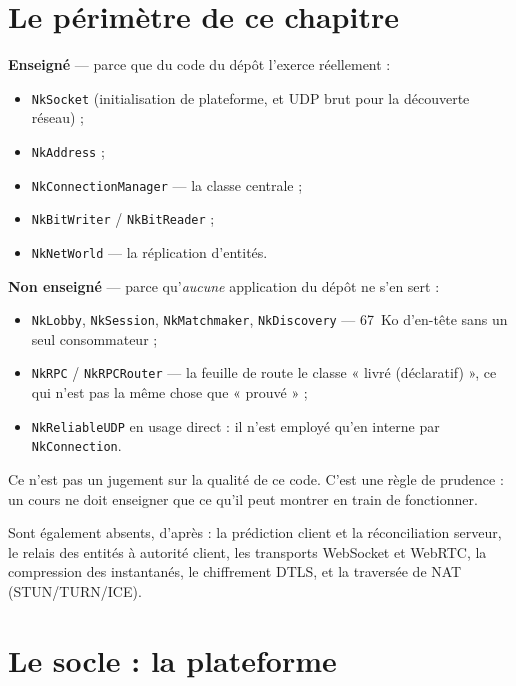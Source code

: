 \section{Le périmètre de ce chapitre}

\begin{nkretenir}
\textbf{Enseigné} — parce que du code du dépôt l'exerce réellement :
\begin{itemize}
  \item \texttt{NkSocket} (initialisation de plateforme, et UDP brut pour la
        découverte réseau) ;
  \item \texttt{NkAddress} ;
  \item \texttt{NkConnectionManager} — la classe centrale ;
  \item \texttt{NkBitWriter} / \texttt{NkBitReader} ;
  \item \texttt{NkNetWorld} — la réplication d'entités.
\end{itemize}

\textbf{Non enseigné} — parce qu'\emph{aucune} application du dépôt ne s'en
sert :
\begin{itemize}
  \item \texttt{NkLobby}, \texttt{NkSession}, \texttt{NkMatchmaker},
        \texttt{NkDiscovery} — 67~Ko d'en-tête sans un seul consommateur ;
  \item \texttt{NkRPC} / \texttt{NkRPCRouter} — la feuille de route le classe
        « livré (déclaratif) », ce qui n'est pas la même chose que « prouvé » ;
  \item \texttt{NkReliableUDP} en usage direct : il n'est employé qu'en interne
        par \texttt{NkConnection}.
\end{itemize}

Ce n'est pas un jugement sur la qualité de ce code. C'est une règle de prudence :
un cours ne doit enseigner que ce qu'il peut montrer en train de fonctionner.
\end{nkretenir}

Sont également absents, d'après  : la prédiction client
et la réconciliation serveur, le relais des entités à autorité client, les
transports WebSocket et WebRTC, la compression des instantanés, le chiffrement
DTLS, et la traversée de NAT (STUN/TURN/ICE).

\section{Le socle : la plateforme}

